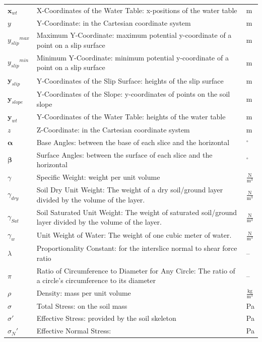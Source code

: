 \documentclass[12pt]{article}
\begin{document}
\begin{longtabu}{l X[l] l}
${\mathbf{x}_{wt}}$ & X-Coordinates of the Water Table: x-positions of the water table & m
\\
$y$ & Y-Coordinate: in the Cartesian coordinate system & m
\\
${{y_{slip}}^{max}}$ & Maximum Y-Coordinate: maximum potential y-coordinate of a point on a slip surface & m
\\
${{y_{slip}}^{min}}$ & Minimum Y-Coordinate: minimum potential y-coordinate of a point on a slip surface & m
\\
${\mathbf{y}_{slip}}$ & Y-Coordinates of the Slip Surface: heights of the slip surface & m
\\
${\mathbf{y}_{slope}}$ & Y-Coordinates of the Slope: y-coordinates of points on the soil slope & m
\\
${\mathbf{y}_{wt}}$ & Y-Coordinates of the Water Table: heights of the water table & m
\\
$z$ & Z-Coordinate: in the Cartesian coordinate system & m
\\
$\mathbf{α}$ & Base Angles: between the base of each slice and the horizontal & ${}^{\circ}$
\\
$\mathbf{β}$ & Surface Angles: between the surface of each slice and the horizontal & ${}^{\circ}$
\\
$γ$ & Specific Weight: weight per unit volume & $\frac{\text{N}}{\text{m}^{3}}$
\\
${γ_{dry}}$ & Soil Dry Unit Weight: The weight of a dry soil/ground layer divided by the volume of the layer. & $\frac{\text{N}}{\text{m}^{3}}$
\\
${γ_{Sat}}$ & Soil Saturated Unit Weight: The weight of saturated soil/ground layer divided by the volume of the layer. & $\frac{\text{N}}{\text{m}^{3}}$
\\
${γ_{w}}$ & Unit Weight of Water: The weight of one cubic meter of water. & $\frac{\text{N}}{\text{m}^{3}}$
\\
$λ$ & Proportionality Constant: for the interslice normal to shear force ratio & --
\\
$π$ & Ratio of Circumference to Diameter for Any Circle: The ratio of a circle's circumference to its diameter & --
\\
$ρ$ & Density: mass per unit volume & $\frac{\text{kg}}{\text{m}^{3}}$
\\
$σ$ & Total Stress: on the soil mass & Pa
\\
$σ'$ & Effective Stress: provided by the soil skeleton & Pa
\\
${σ_{N}}'$ & Effective Normal Stress:  & Pa

\end{longtabu}
\end{document}
